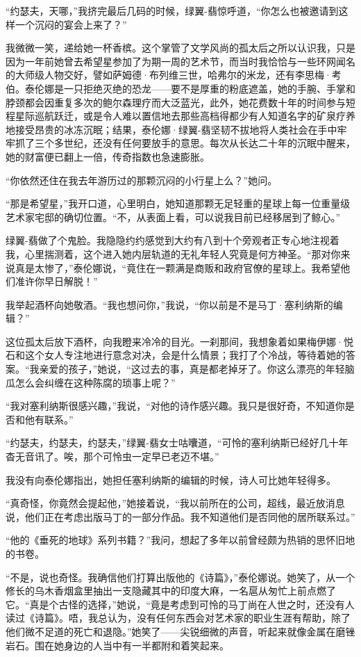\documentclass[AutoFakeBold=true]{book}
\begin{document}
``约瑟夫，{\kaishu 天哪}，''我挤完最后几码的时候，绿翼-翡惊呼道，``你怎么{\kaishu 也}被邀请到这样一个沉闷的宴会上来了？''

我微微一笑，递给她一杯香槟。这个掌管了文学风尚的孤太后之所以认识我，只是因为一年前她曾去希望星参加了为期一周的艺术节，而当时我恰恰与一些环网闻名的大师级人物交好，譬如萨姆德·布列维三世，哈弗尔的米龙，还有李思梅·考伯。泰伦娜是一只拒绝灭绝的恐龙——要不是厚重的粉底遮盖，她的手腕、手掌和脖颈都会因重复多次的鲍尔森理疗而大泛蓝光，此外，她花费数十年的时间参与短程星际巡航跃迁，或是令人难以置信地去那些高档得都少有人知道名字的矿泉疗养地接受昂贵的冰冻沉眠；结果，泰伦娜·绿翼-翡坚韧不拔地将人类社会在手中牢牢抓了三个多世纪，还没有任何要放手的意思。每次从长达二十年的沉眠中醒来，她的财富便已翻上一倍，传奇指数也急速膨胀。

``你依然还住在我去年游历过的那颗{\kaishu 沉闷}的小行星上么？''她问。

``那是希望星，''我开口道，心里明白，她知道那颗无足轻重的星球上每一位重量级艺术家宅邸的确切位置。``不，从表面上看，可以说我目前已经移居到了鲸心。''

绿翼-翡做了个鬼脸。我隐隐约约感觉到大约有八到十个旁观者正专心地注视着我，心里揣测着，这个进入{\kaishu 她}内层轨道的无礼年轻人究竟是何方神圣。``那对你来说真是太惨了，''泰伦娜说，``竟住在一颗满是商贩和政府官僚的星球上。我希望他们准许你早日解脱！''

我举起酒杯向她敬酒。``我也想问你，''我说，``你以前是不是马丁·塞利纳斯的编辑？''

这位孤太后放下酒杯，向我瞪来冷冷的目光。一刹那间，我想象着如果梅伊娜·悦石和这个女人专注地进行意念对决，会是什么情景；我打了个冷战，等待着她的答案。``我亲爱的孩子，''她说，``这过去的事，真是都{\kaishu 老掉牙}了。你这么漂亮的年轻脑瓜怎么会纠缠在这种陈腐的琐事上呢？''

``我对塞利纳斯很感兴趣，''我说，``对他的诗作感兴趣。我只是很好奇，不知道你是否和他有联系。''

``约瑟夫，约瑟夫，约瑟夫，''绿翼-翡女士咕囔道，``可怜的塞利纳斯已经{\kaishu 好几十年}杳无音讯了。唉，那个可怜虫一定早已{\kaishu 老迈不堪}。''

我没有向泰伦娜指出，她担任塞利纳斯的编辑的时候，诗人可比她年轻得多。

``真奇怪，你竟然会提起他，''她接着说，``我以前所在的公司，超线，最近放消息说，他们正在考虑出版马丁的一部分作品。我不知道他们是否同他的居所联系过。''

``他的《垂死的地球》系列书籍？''我问，想起了多年以前曾经颇为热销的思怀旧地的书卷。

``不是，说也奇怪。我确信他们打算出版他的《诗篇》，''泰伦娜说。她笑了，从一个修长的乌木香烟盒里抽出一支隐藏其中的印度大麻，一名扈从匆忙上前点燃了它。``真是个{\kaishu 古怪}的选择，''她说，``竟是考虑到可怜的马丁尚在人世之时，还没有人读过《诗篇》。唔，我总认为，没有任何东西会对艺术家的职业生涯有帮助，除了他们微不足道的死亡和退隐。''她笑了——尖锐细微的声音，听起来就像金属在磨锉岩石。围在她身边的人当中有一半都附和着笑起来。
\end{document}
